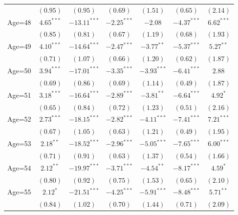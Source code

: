 \documentclass[fullpage]{paper}
\begin{document}
\begin{center}
\begin{longtable}{l c c c c c c }
            & $(0.95)$      & $(0.95)$       & $(0.69)$      & $(1.51)$       & $(0.65)$       & $(2.14)$      \\
Age=48      & $4.65^{***}$  & $-13.11^{***}$ & $-2.25^{***}$ & $-2.08$        & $-4.37^{***}$  & $6.62^{***}$  \\
            & $(0.85)$      & $(0.81)$       & $(0.67)$      & $(1.19)$       & $(0.68)$       & $(1.93)$      \\
Age=49      & $4.10^{***}$  & $-14.64^{***}$ & $-2.47^{***}$ & $-3.77^{**}$   & $-5.37^{***}$  & $5.27^{**}$   \\
            & $(0.71)$      & $(1.07)$       & $(0.66)$      & $(1.20)$       & $(0.62)$       & $(1.87)$      \\
Age=50      & $3.94^{***}$  & $-17.01^{***}$ & $-3.35^{***}$ & $-3.93^{***}$  & $-6.41^{***}$  & $2.88$        \\
            & $(0.69)$      & $(0.86)$       & $(0.69)$      & $(1.14)$       & $(0.49)$       & $(1.87)$      \\
Age=51      & $3.18^{***}$  & $-16.64^{***}$ & $-2.89^{***}$ & $-3.81^{**}$   & $-6.64^{***}$  & $4.92^{*}$    \\
            & $(0.65)$      & $(0.84)$       & $(0.72)$      & $(1.23)$       & $(0.51)$       & $(2.16)$      \\
Age=52      & $2.73^{***}$  & $-18.15^{***}$ & $-2.82^{***}$ & $-4.11^{***}$  & $-7.41^{***}$  & $7.21^{***}$  \\
            & $(0.67)$      & $(1.05)$       & $(0.63)$      & $(1.21)$       & $(0.49)$       & $(1.95)$      \\
Age=53      & $2.18^{**}$   & $-18.52^{***}$ & $-2.96^{***}$ & $-5.05^{***}$  & $-7.65^{***}$  & $6.00^{***}$  \\
            & $(0.71)$      & $(0.91)$       & $(0.63)$      & $(1.37)$       & $(0.54)$       & $(1.66)$      \\
Age=54      & $2.12^{**}$   & $-19.97^{***}$ & $-3.71^{***}$ & $-4.54^{**}$   & $-8.17^{***}$  & $4.59^{*}$    \\
            & $(0.80)$      & $(0.92)$       & $(0.75)$      & $(1.53)$       & $(0.65)$       & $(2.10)$      \\
Age=55      & $2.12^{*}$    & $-21.51^{***}$ & $-4.25^{***}$ & $-5.91^{***}$  & $-8.48^{***}$  & $5.71^{**}$   \\
            & $(0.84)$      & $(1.02)$       & $(0.70)$      & $(1.44)$       & $(0.71)$       & $(2.09)$      \\

\end{longtable}
\end{center}
\end{document}
